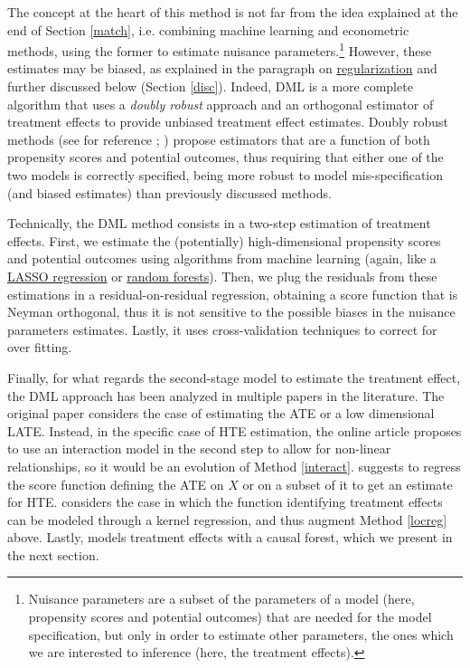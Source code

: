 \documentclass[12pt,a4paper,openright,twoside]{book}
\newcommand{\customref}[2]{\hyperref[#1]{#2}}
\begin{document}
\begin{doublespacing}
The concept at the heart of this method is not far from the idea explained at the end of Section \ref{match}, i.e. combining machine learning and econometric methods, using the former to estimate nuisance parameters.\footnote{Nuisance parameters are a subset of the parameters of a model (here, propensity scores and potential outcomes) that are needed for the model specification, but only in order to estimate other parameters, the ones which we are interested to inference (here, the treatment effects).} However, these estimates may be biased, as explained in the paragraph on \customref{regofcv}{regularization} and further discussed below (Section \ref{disc}). Indeed, DML is a more complete algorithm that uses a \textit{doubly robust} approach and an orthogonal estimator of treatment effects to provide unbiased treatment effect estimates. Doubly robust methods (see for reference \citealp{huber2023causal}; \citealp{kennedy2023}) propose estimators that are a function of both propensity scores and potential outcomes, thus requiring that either one of the two models is correctly specified, being more robust to model mis-specification (and biased estimates) than previously discussed methods. 


Technically, the DML method consists in a two-step estimation of treatment effects. First, we estimate the (potentially) high-dimensional propensity scores and potential outcomes using algorithms from machine learning (again, like a \customref{lasso}{LASSO regression} or \customref{rf}{random forests}). Then, we plug the residuals from these estimations in a residual-on-residual regression, obtaining a score function that is Neyman orthogonal, thus it is not sensitive to the possible biases in the nuisance parameters estimates. Lastly, it uses cross-validation techniques to correct for over fitting. 

Finally, for what regards the second-stage model to estimate the treatment effect, the DML approach has been analyzed in multiple papers in the literature. The original paper \citet{chernozhukov2018double} considers the case of estimating the ATE or a low dimensional LATE. Instead, in the specific case of HTE estimation, the online article \citet{towardsds} proposes to use an interaction model in the second step to allow for non-linear relationships, so it would be an evolution of Method \ref{interact}. \citet{huber2023causal} suggests to regress the score function defining the ATE on $X$ or on a subset of it to get an estimate for HTE.
\citet{nie2021quasi} considers the case in which the function identifying treatment effects can be modeled through a kernel regression, and thus augment Method \ref{locreg} above. 
Lastly, \citet{wagerathey2018} models treatment effects with a causal forest, which we present in the next section.


\end{doublespacing}
\end{document}
